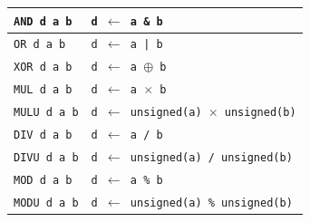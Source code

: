\documentclass[table]{beamer}
\begin{document}
\begin{frame}[fragile]
\begin{table}
\begin{tabular}{|l|l|}
	\rowcolor{Gray} \texttt{AND d a b} & \texttt{d $\leftarrow$ a \& b}\\ \hline
	\rowcolor{Gray} \texttt{OR d a b} & \texttt{d $\leftarrow$ a | b}\\ \hline
	\rowcolor{Gray} \texttt{XOR d a b} & \texttt{d $\leftarrow$ a $\oplus$ b}\\ \hline
	\texttt{MUL d a b} & \texttt{d $\leftarrow$ a $\times$ b}\\ \hline
	\rowcolor{Gray} \texttt{MULU d a b} & \texttt{d $\leftarrow$ unsigned(a) $\times$ unsigned(b)}\\ \hline
	\texttt{DIV d a b} & \texttt{d $\leftarrow$ a / b}\\ \hline
	\rowcolor{Gray} \texttt{DIVU d a b} & \texttt{d $\leftarrow$ unsigned(a) / unsigned(b)}\\ \hline
	\texttt{MOD d a b} & \texttt{d $\leftarrow$ a \% b}\\ \hline
	\rowcolor{Gray} \texttt{MODU d a b} & \texttt{d $\leftarrow$ unsigned(a) \% unsigned(b)}\\ \hline
	\end{tabular}
  \end{table}
\end{frame}

    
\end{document}
